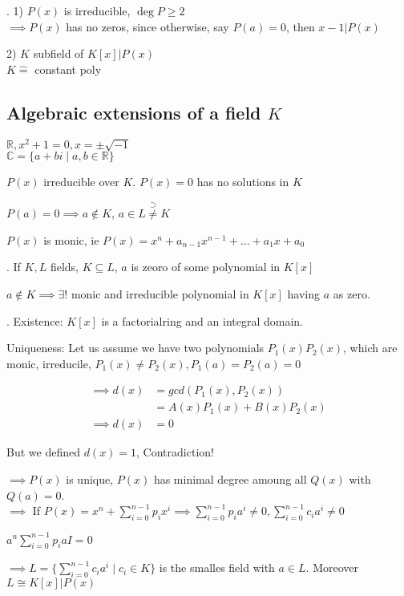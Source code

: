 \Remark.
1) $P(x)$ is irreducible, $\deg P \geq 2$ \\
$\implies P(x)$ has no zeros, since otherwise, say $P(a) = 0$, then $x -1 | P(x)$

2) $K$ subfield of $K[x]|P(x)$\\
$K\hat{=}$ constant poly

\subsection{Algebraic extensions of a field $K$}
$\mathbb{R}, x^2 +1 = 0, x = \pm \sqrt{-1}$ \\
$\mathbb{C} = \{a+bi \mid a,b \in \mathbb{R} \}$

$P(x)$ irreducible over $K$. $P(x) = 0$ has no solutions in $K$

$P(a) = 0 \implies a\notin K$, $ a \in L \stackrel{\supset}{\neq} K$

$P(x)$ is monic, ie $P(x) = x^n + a_{n-1}x^{n-1} + \ldots + a_1 x + a_0$

\Theorem.
If $K,L$ fields, $K\subseteq L$, $a$ is zeoro of some polynomial in $K[x]$

$a \notin K \implies \exists!$ monic and irreducible polynomial in $K[x]$ having $a$ as zero.

\Proof.
Existence: $K[x]$ is a factorialring and an integral domain. 

Uniqueness: Let us assume we have two polynomials $P_1(x) P_2(x)$, which are monic, irreducile, $P_1(x) \neq P_2(x), P_1(a) = P_2(a) = 0$

\begin{align*}
  \implies d(x) &= gcd(P_1(x), P_2(x))\\
                &= A(x) P_1(x) + B(x) P_2(x) \\
  \implies d(x) &= 0
\end{align*}

But we defined $d(x) = 1$, Contradiction!

$\implies P(x)$ is unique, $P(x)$ has minimal degree amoung all $Q(x)$ with $Q(a) = 0$. \\
$\implies$ If $P(x) = x^n + \sum_{i=0}^{n-1} p_i x^i \implies \sum_{i=0}^{n-1} p_i a^i \neq 0, \sum_{i=0}^{n-1} c_i a^i \neq 0$ 

$a^n \sum_{i=0}^{n-1} p_i aI = 0$


$\implies L = \{ \sum_{i=0}^{n-1} c_i a^i \mid c_i \in K\}$ is the smalles field with $a \in L$. Moreover $L \cong K[x]|P(x)$

